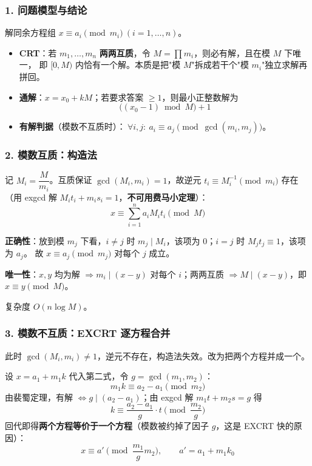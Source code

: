 \subsubsection*{1. 问题模型与结论}

解同余方程组 $x \equiv a_i \pmod{m_i}\ (i = 1, \dots, n)$。

\begin{itemize}
    \item \textbf{CRT}：若 $m_1, \dots, m_n$ \textbf{两两互质}，令 $M = \prod m_i$，则必有解，且在模 $M$ 下唯一，
    即 $[0, M)$ 内恰有一个解。本质是把"模 $M$"拆成若干个"模 $m_i$"独立求解再拼回。
    \item \textbf{通解}：$x = x_0 + kM$；若要求答案 $\ge 1$，则最小正整数解为
    $$\big((x_0 - 1) \bmod M\big) + 1$$
    \item \textbf{有解判据}（模数不互质时）：$\ \forall i, j:\ a_i \equiv a_j \pmod{\gcd(m_i, m_j)}$。
\end{itemize}

\hrulefill

\subsubsection*{2. 模数互质：构造法}

记 $M_i = \dfrac{M}{m_i}$。互质保证 $\gcd(M_i, m_i) = 1$，故逆元 $t_i \equiv M_i^{-1} \pmod{m_i}$ 存在
（用 exgcd 解 $M_i t_i + m_i s_i = 1$，\textbf{不可用费马小定理}）：
$$\boxed{\;x \equiv \sum_{i=1}^{n} a_i M_i t_i \pmod M\;}$$

\textbf{正确性}：放到模 $m_j$ 下看，$i \neq j$ 时 $m_j \mid M_i$，该项为 $0$；$i = j$ 时 $M_j t_j \equiv 1$，该项为 $a_j$。
故 $x \equiv a_j \pmod{m_j}$ 对每个 $j$ 成立。

\textbf{唯一性}：$x, y$ 均为解 $\Rightarrow m_i \mid (x - y)$ 对每个 $i$；两两互质 $\Rightarrow M \mid (x-y)$，即 $x \equiv y \pmod M$。

复杂度 $O(n \log M)$。

\hrulefill

\subsubsection*{3. 模数不互质：EXCRT 逐方程合并}

此时 $\gcd(M_i, m_i) \neq 1$，逆元不存在，构造法失效。改为把两个方程并成一个。

设 $x = a_1 + m_1 k$ 代入第二式，令 $g = \gcd(m_1, m_2)$：
$$m_1 k \equiv a_2 - a_1 \pmod{m_2}$$
由裴蜀定理，有解 $\iff g \mid (a_2 - a_1)$；由 exgcd 解 $m_1 t + m_2 s = g$ 得
$$k \equiv \frac{a_2 - a_1}{g} \cdot t \pmod{\frac{m_2}{g}}$$
回代即得\textbf{两个方程等价于一个方程}（模数被约掉了因子 $g$，这是 EXCRT 快的原因）：
$$\boxed{\;x \equiv a' \pmod{\frac{m_1}{g} m_2}, \qquad a' = a_1 + m_1 k_0\;}$$

